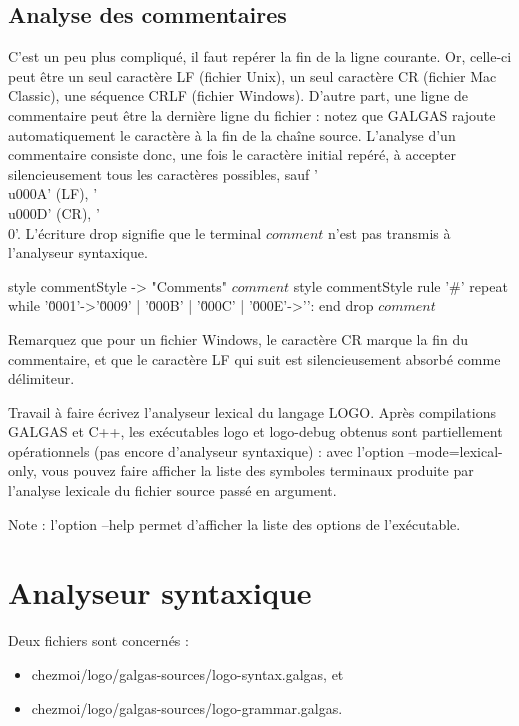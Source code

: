 \subsection{Analyse des commentaires}
C'est un peu plus compliqué, il faut repérer la fin de la ligne courante. Or, celle-ci peut être un seul caractère LF (fichier Unix), un seul caractère CR (fichier Mac Classic), une séquence CRLF (fichier Windows). D'autre part, une ligne de commentaire peut être la dernière ligne du fichier : notez que GALGAS rajoute automatiquement le caractère  à la fin de la chaîne source. L'analyse d'un commentaire consiste donc, une fois le caractère initial  repéré, à accepter silencieusement tous les caractères possibles, sauf '\\u000A' (LF), '\\u000D' (CR), '\\0'. L’écriture drop  signifie que le terminal $comment$ n’est pas transmis à l’analyseur syntaxique.

\begin{galgascode}
style commentStyle -> "Comments"
$comment$ style commentStyle %
rule '#' {
  repeat
  while '\u0001'->'\u0009' | '\u000B' | '\u000C' | '\u000E'->'\uFFFD':
  end
  drop $comment$
}
\end{galgascode}

Remarquez que pour un fichier Windows, le caractère CR marque la fin du commentaire, et que le caractère LF qui suit est silencieusement absorbé comme délimiteur.

Travail à faire
écrivez l'analyseur lexical du langage LOGO. Après compilations GALGAS et C++, les exécutables logo et logo-debug obtenus sont partiellement opérationnels (pas encore d’analyseur syntaxique) : avec l'option --mode=lexical-only, vous pouvez faire afficher la liste des symboles terminaux produite par l'analyse lexicale du fichier source passé en argument.

Note : l'option --help permet d'afficher la liste des options de l'exécutable. 

\section{Analyseur syntaxique}

Deux fichiers sont concernés :
\begin{itemize}
  \item chezmoi/logo/galgas-sources/logo-syntax.galgas, et
  \item chezmoi/logo/galgas-sources/logo-grammar.galgas.
\end{itemize}

